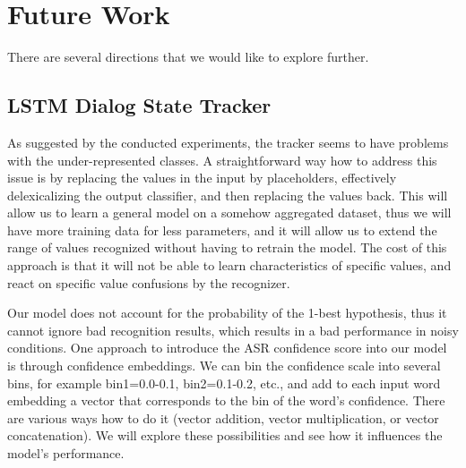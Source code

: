 \documentclass[runningheads,a4paper]{llncs}
\begin{document}




\section{Future Work}
\label{sec:future_work}
There are several directions that we would like to explore further.

\subsection{LSTM Dialog State Tracker}
As suggested by the conducted experiments, the tracker seems to have problems with the under-represented classes. A straightforward way how to address this issue is by replacing the values in the input by placeholders, effectively delexicalizing the output classifier, and then replacing the values back. This will allow us to learn a general model on a somehow aggregated dataset, thus we will have more training data for less parameters, and it will allow us to extend the range of values recognized without having to retrain the model. The cost of this approach is that it will not be able to learn characteristics of specific values, and react on specific value confusions by the recognizer.

Our model does not account for the probability of the 1-best hypothesis, thus it cannot ignore bad recognition results, which results in a bad performance in noisy conditions. One approach to introduce the ASR confidence score into our model is through confidence embeddings. We can bin the confidence scale into several bins, for example bin1=0.0-0.1, bin2=0.1-0.2, etc., and add to each input word embedding a vector that corresponds to the bin of the word's confidence. There are various ways how to do it (vector addition, vector multiplication, or vector concatenation). We will explore these possibilities and see how it influences the model's performance.
\end{document}
